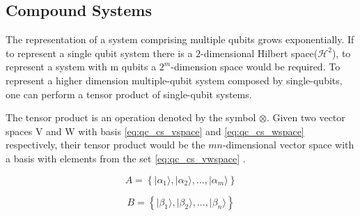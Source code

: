 \begin{comment}
Observables are deemed as the physical properties that can be measured. One way to think of them is to consider the 20 question game, where a two player game where one person thinks of an object and then the second person has a set of 20 "Yes" or "No" to discover the object, one observable could be "Is it red?". With each question the space comprising the possible answers will not increase, this means that asking two times in a row if the object is red in the game will always yield the same answer.
 
Hermitian operators are suitable for being used as observables, as their eigenvalues are real numbers.
The eigenvectors associated with the eigenvalues of the observable will correspond to the state in which the system will be after applying the Hermitian operator. Thus applying an observable to the system can be viewed as doing a projection of the system in the basis formed by the eigenvectors.  
\end{comment}

\subsection{Compound Systems}
\label{subsec:compound_systems}

The representation of a system comprising multiple qubits grows exponentially. If to represent a single qubit system there is a $2$-dimensional Hilbert space($\mathcal{H}^{2}$), to represent a system with m qubits a $2^m$-dimension space would be required. 
To represent a higher dimension multiple-qubit system composed by single-qubits, one can perform a tensor product of single-qubit systems.

The tensor product is an operation denoted by the symbol $\otimes$. 
Given two vector spaces V and W with basis 
\eqref{eq:qc_cs_vspace} and \eqref{eq:qc_cs_wspace}
respectively, their tensor product would be the $mn$-dimensional vector space with a basis with elements from the set \eqref{eq:qc_cs_vwspace} \cite{Rieffel2011}.


\begin{equation}
\label{eq:qc_cs_vspace}
A = \left\{ \vert \alpha_{1} \rangle, \vert \alpha_{2} \rangle , ..., \vert \alpha_{m} \rangle \right\}
\end{equation} 

\begin{equation} 
\label{eq:qc_cs_wspace}
B = \left\{ \vert \beta_{1} \rangle, \vert \beta_{2} \rangle , ..., \vert \beta_{n} \rangle \right\}
\end{equation} 


